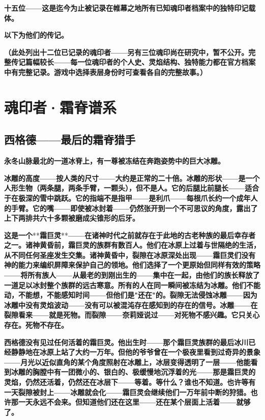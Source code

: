 \documentclass[12pt,a4paper,openany]{ctexbook}
\begin{document}
\textbf{十五位——这是迄今为止被记录在帷幕之地所有已知魂印者档案中的独特印记载体。}


\textbf{以下为他们的传记。}


\textbf{（此处列出十二位已记录的魂印者——另有三位魂印尚在研究中，暂不公开。完整传记篇幅较长——每一位魂印者的个人史、灵焰结构、独特能力都在官方档案中有完整记录。游戏中选择表层身份时可查看各自的完整故事。）}


\section*{魂印者·霜脊谱系}


\subsection*{西格德——最后的霜脊猎手}


\textbf{永冬山脉最北的一道冰脊上，有一尊被冻结在奔跑姿势中的巨大冰雕。}


\textbf{冰雕的高度——按人类的尺寸——大约是正常的二十倍。冰雕的形状——是一个人形生物（两条腿，两条手臂，一颗头），但不是人。它的后腿比前腿长——适合于在极深的雪中跳跃。它的指端不是指甲——是利爪——每根爪长约一个成年人的手臂。它的嘴——即使被冰封着——仍然张开到一个不可思议的角度，露出了上下两排共六十多颗被磨成尖锥形的后牙。}


\textbf{这是一个}**\textbf{霜巨灵}**\textbf{——在诸神时代之前就存在于此地的古老种族的最后幸存者之一。诸神黄昏前，霜巨灵的族群有数百人。他们在冰原上过着与世隔绝的生活，从不同任何圣座发生交集。诸神黄昏中，裂隙在冰原深处出现——霜巨灵们没有神的能力来编织屏障来保护自己的领地。他们选择了一个更原始但同样有效的策略——将所有族人——从最老的到刚出生的——集中在一起，由他们的族长释放了一道足以冰封整个族群的远古寒意。所有的人在同一瞬间被冻结为冰雕。他们不能动，不能想，不能感知时间——但他们是"还在"的。裂隙无法侵蚀冰雕——因为冰雕中没有灵焰波动——没有可以被混沌存在感知到的存在的信号。冰雕——在裂隙看来——就是死物。而裂隙——奈莉娅说过——对死物不感兴趣。它只关心存在。死物不存在。}


\textbf{西格德没有见过任何活着的霜巨灵。他出生时——那个霜巨灵族群的最后冰川已经静静地在冰原上站了大约一万年。但他的爷爷曾在一个极夜里看到过奇异的景象——月光以近似直角的某个角度照射在冰雕上，冰层变得透明了一层——他能看到冰雕的胸膛中有一团微小的、银白的、极缓慢地沉浮着的光——那是霜巨灵的灵焰，仍然还活着，仍然还在冰层下——等着。等什么？谁也不知道。也许等有一天裂隙被封上——冰雕就会化——霜巨灵会继续他们一万年前中断的狩猎。也许那一天永远不会来。但知道他们还在这里——还在某个层面上活着——就够了。}
\end{document}
